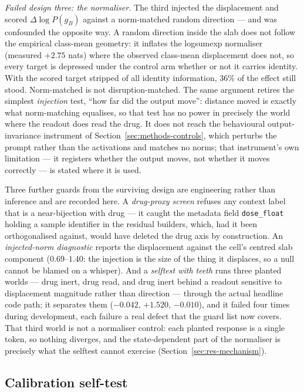 \emph{Failed design three: the normaliser.} The third injected the displacement and scored
$\Delta \log P(g_B)$ against a norm-matched random direction --- and was confounded the opposite
way. A random direction inside the slab does not follow the empirical class-mean geometry: it
inflates the logsumexp normaliser (measured $+2.75$ nats) where the observed class-mean displacement
does not, so every target is
depressed under the control arm whether or not it carries identity. With the scored target stripped
of all identity information, $36\%$ of the effect still stood. Norm-matched is not
disruption-matched. The same argument retires the simplest \emph{injection} test, ``how far did the
output move'': distance moved is exactly what norm-matching equalises, so that test has no power in
precisely the world where the readout does read the drug. It does not reach the behavioural
output-invariance instrument of Section~\ref{sec:methods-controls}, which perturbs the prompt rather
than the activations and matches no norms; that instrument's own limitation --- it registers whether
the output moves, not whether it moves correctly --- is stated where it is used.

Three further guards from the surviving design are engineering rather than inference and are
recorded here. A \emph{drug-proxy screen} refuses any context label that is a near-bijection with
drug --- it caught the metadata field \texttt{dose\_float} holding a sample identifier in the
residual builders, which, had it been orthogonalised against, would have deleted the drug axis by
construction. An \emph{injected-norm diagnostic} reports the displacement against the cell's
centred slab component ($0.69$--$1.40$: the injection is the size of the thing it displaces, so a
null cannot be blamed on a whisper). And a \emph{selftest with teeth} runs three planted worlds ---
drug inert, drug read, and drug inert behind a readout sensitive to displacement magnitude rather
than direction --- through the actual headline code path; it separates them ($-0.042$, $+1.520$,
$-0.010$), and it failed four times during development, each failure a real defect that the guard
list now covers. That third world is not a normaliser control: each planted response is a single
token, so nothing diverges, and the state-dependent part of the normaliser is precisely what the
selftest cannot exercise (Section~\ref{sec:res-mechanism}).

\subsection{Calibration self-test}
\label{sec:app-selftest}

